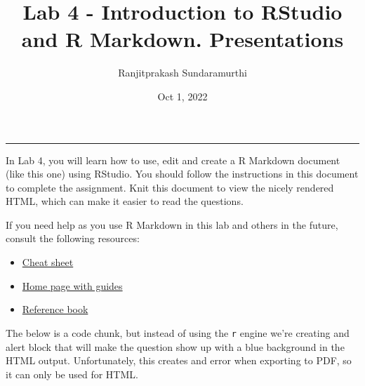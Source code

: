 \documentclass[
]{article}
\title{Lab 4 - Introduction to RStudio and R Markdown. Presentations}
\author{Ranjitprakash Sundaramurthi}
\date{Oct 1, 2022}
\providecommand{\tightlist}{%
  \setlength{\itemsep}{0pt}\setlength{\parskip}{0pt}}
\begin{document}
\maketitle

{
\setcounter{tocdepth}{2}
\tableofcontents
}
\begin{center}\rule{0.5\linewidth}{0.5pt}\end{center}

In Lab 4, you will learn how to use, edit and create a R Markdown
document (like this one) using RStudio. You should follow the
instructions in this document to complete the assignment. Knit this
document to view the nicely rendered HTML, which can make it easier to
read the questions.

If you need help as you use R Markdown in this lab and others in the
future, consult the following resources:

\begin{itemize}
\tightlist
\item
  \href{https://rmarkdown.rstudio.com/lesson-15.html}{Cheat sheet}
\item
  \href{https://rmarkdown.rstudio.com/docs/}{Home page with guides}
\item
  \href{https://bookdown.org/yihui/rmarkdown/}{Reference book}
\end{itemize}

The below is a code chunk, but instead of using the \texttt{r} engine
we're creating and alert block that will make the question show up with
a blue background in the HTML output. Unfortunately, this creates and
error when exporting to PDF, so it can only be used for HTML.
\end{document}
